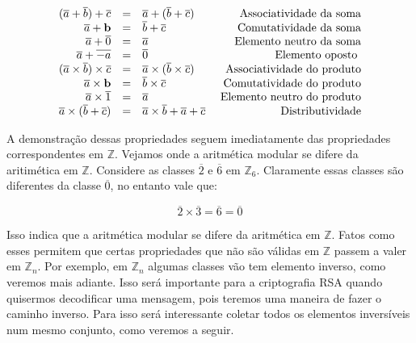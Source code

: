 \[
\begin{array}{rclr}
(\overline{a}+\overline{b})+\overline{c} &=& \overline{a}+(\overline{b}+\overline{c}) & \hfill\textrm{ Associatividade da soma}\\
\overline{a}+\textbf{b}									 &=& \overline{b}+\overline{c} 								& \hfill\textrm{ Comutatividade da soma}\\
\overline{a}+\overline{0} 							 &=& \overline{a} 														& \hfill\textrm{ Elemento neutro da soma}\\
\overline{a}+\overline{-a}							 &=& \overline{0} 														& \hfill\textrm{ Elemento oposto }\\
(\overline{a}\times\overline{b})\times\overline{c} &=& \overline{a}\times(\overline{b}\times\overline{c}) & \hfill\textrm{ Associatividade do produto}\\
\overline{a}\times\textbf{b}								 &=& \overline{b}\times\overline{c} 								& \hfill\textrm{ Comutatividade do produto}\\
\overline{a}\times\overline{1} 							 &=& \overline{a} 														& \hfill\textrm{ Elemento neutro do produto}\\
\overline{a}\times(\overline{b}+\overline{c})&=& \overline{a}\times\overline{b}+\overline{a}+\overline{c} 														& \hfill\textrm{ Distributividade}\\
\end{array}
\]

A demonstra\c{c}\~{a}o dessas propriedades seguem imediatamente das propriedades correspondentes em $\mathbb{Z}$.
Vejamos onde a aritm\'{e}tica modular se difere da aritim\'{e}tica em $\mathbb{Z}$. Considere as classes 
$\overline{2}$ e $\overline{6}$ em $\mathbb{Z}_{6}$. Claramente essas classes s\~{a}o diferentes
da classe $\overline{0}$, no entanto vale que:

$$\overline{2}\times\overline{3}=\overline{6}=\overline{0}$$
 
Isso indica que a aritm\'{e}tica modular se difere da aritm\'{e}tica em $\mathbb{Z}$. Fatos como esses 
permitem que certas propriedades que n\~{a}o s\~{a}o v\'{a}lidas em $\mathbb{Z}$ passem a valer em $\mathbb{Z}_{n}$. 
Por exemplo, em $\mathbb{Z}_{n}$ algumas classes v\~{a}o tem elemento inverso, como veremos mais adiante. 
Isso ser\'{a} importante para a criptografia RSA quando quisermos decodificar uma mensagem, pois teremos uma maneira de 
fazer o caminho inverso. Para isso ser\'{a} interessante coletar todos os elementos invers\'{i}veis num mesmo conjunto, 
como veremos a seguir.
  
